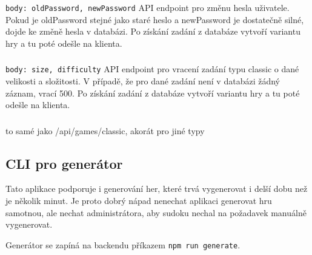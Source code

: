 \documentclass[a4paper,oneside,12pt]{report}
\begin{document}
\subsubsection{\color{apiblue}{POST -- /api/user/password}}
\texttt{body: oldPassword, newPassword} 
API endpoint pro změnu hesla uživatele. Pokud je oldPassword stejné jako staré heslo a newPassword je dostatečně silné, dojde ke změně hesla v databázi. Po získání zadání z databáze vytvoří variantu hry a tu poté odešle na klienta.

\subsubsection{\color{apigreen}{GET -- /api/games/classic}}
\texttt{body: size, difficulty} 
API endpoint pro vracení zadání typu classic o dané velikosti a složitosti. V případě, že pro dané zadání není v databázi žádný záznam, vrací 500. Po získání zadání z databáze vytvoří variantu hry a tu poté odešle na klienta.

\subsubsection{\color{apigreen}{GET -- /api/games/classicX}}
\subsubsection{\color{apigreen}{GET -- /api/games/jigsaw}}
\subsubsection{\color{apigreen}{GET -- /api/games/samurai}}
\subsubsection{\color{apigreen}{GET -- /api/games/samuraiMixed}}
to samé jako /api/games/classic, akorát pro jiné typy

\subsection{CLI pro generátor}
Tato aplikace podporuje i generování her, které trvá vygenerovat i delší dobu než je několik minut. Je proto dobrý nápad nenechat aplikaci generovat hru samotnou, ale nechat administrátora, aby sudoku nechal na požadavek manuálně vygenerovat. 

Generátor se zapíná na backendu příkazem \texttt{npm run generate}. 
\end{document}
